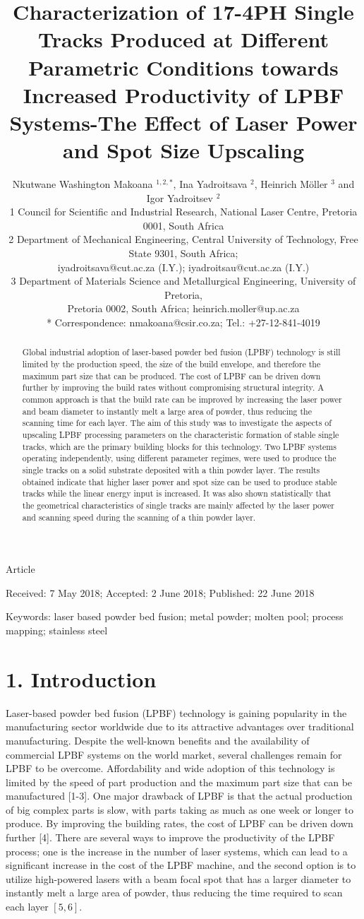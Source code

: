 \documentclass[10pt]{article}
\title{Characterization of 17-4PH Single Tracks Produced at Different Parametric Conditions towards Increased Productivity of LPBF Systems-The Effect of Laser Power and Spot Size Upscaling }
\author{Nkutwane Washington Makoana $^{1,2, *}$, Ina Yadroitsava ${ }^{2}$, Heinrich Möller ${ }^{3}$ and Igor Yadroitsev ${ }^{2}$\\
1 Council for Scientific and Industrial Research, National Laser Centre, Pretoria 0001, South Africa\\
2 Department of Mechanical Engineering, Central University of Technology, Free State 9301, South Africa;\\
iyadroitsava@cut.ac.za (I.Y.); iyadroitsau@cut.ac.za (I.Y.)\\
3 Department of Materials Science and Metallurgical Engineering, University of Pretoria,\\
Pretoria 0002, South Africa; heinrich.moller@up.ac.za\\
* Correspondence: nmakoana@csir.co.za; Tel.: +27-12-841-4019}
\date{}
\begin{document}
\maketitle
Article

Received: 7 May 2018; Accepted: 2 June 2018; Published: 22 June 2018

\begin{abstract}
Global industrial adoption of laser-based powder bed fusion (LPBF) technology is still limited by the production speed, the size of the build envelope, and therefore the maximum part size that can be produced. The cost of LPBF can be driven down further by improving the build rates without compromising structural integrity. A common approach is that the build rate can be improved by increasing the laser power and beam diameter to instantly melt a large area of powder, thus reducing the scanning time for each layer. The aim of this study was to investigate the aspects of upscaling LPBF processing parameters on the characteristic formation of stable single tracks, which are the primary building blocks for this technology. Two LPBF systems operating independently, using different parameter regimes, were used to produce the single tracks on a solid substrate deposited with a thin powder layer. The results obtained indicate that higher laser power and spot size can be used to produce stable tracks while the linear energy input is increased. It was also shown statistically that the geometrical characteristics of single tracks are mainly affected by the laser power and scanning speed during the scanning of a thin powder layer.
\end{abstract}

Keywords: laser based powder bed fusion; metal powder; molten pool; process mapping; stainless steel

\section*{1. Introduction}
Laser-based powder bed fusion (LPBF) technology is gaining popularity in the manufacturing sector worldwide due to its attractive advantages over traditional manufacturing. Despite the well-known benefits and the availability of commercial LPBF systems on the world market, several challenges remain for LPBF to be overcome. Affordability and wide adoption of this technology is limited by the speed of part production and the maximum part size that can be manufactured [1-3]. One major drawback of LPBF is that the actual production of big complex parts is slow, with parts taking as much as one week or longer to produce. By improving the building rates, the cost of LPBF can be driven down further [4]. There are several ways to improve the productivity of the LPBF process; one is the increase in the number of laser systems, which can lead to a significant increase in the cost of the LPBF machine, and the second option is to utilize high-powered lasers with a beam focal spot that has a larger diameter to instantly melt a large area of powder, thus reducing the time required to scan each layer $[5,6]$.
\end{document}
